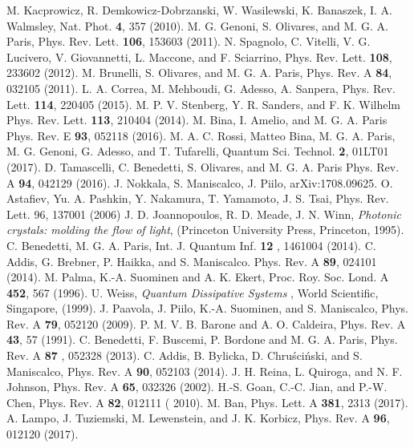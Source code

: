 \documentclass[ pra,a4paper,aps,twocolumn,superscriptaddress]{revtex4-1}
\begin{document}
\begin{thebibliography}{99}
 M. Kacprowicz, R. Demkowicz-Dobrzanski, W. Wasilewski, K. Banaszek, I. A. Walmsley, Nat. Phot. {\bf 4}, 357 (2010). 
 M. G. Genoni, S. Olivares, and M. G. A. Paris, Phys. Rev. Lett. {\bf 106}, 153603 (2011).
 N. Spagnolo, C. Vitelli, V. G. Lucivero, V. Giovannetti, L. Maccone, and F. Sciarrino,  Phys. Rev. Lett. {\bf 108}, 233602 (2012).
 M. Brunelli, S. Olivares, and M. G. A. Paris, Phys. Rev.  A {\bf 84}, 032105 (2011).
 L. A. Correa, M. Mehboudi, G. Adesso, A. Sanpera, 	Phys. Rev. Lett. {\bf 114}, 220405 (2015).
 M. P. V.  Stenberg, Y. R. Sanders, and F. K. Wilhelm
Phys. Rev. Lett. {\bf 113}, 210404 (2014).
 M. Bina, I. Amelio, and M. G. A. Paris
Phys. Rev. E {\bf 93}, 052118 (2016).
 M. A. C. Rossi, Matteo Bina, M. G. A. Paris, M. G. Genoni, G. Adesso, and
T. Tufarelli, Quantum Sci. Technol. {\bf 2}, 01LT01 (2017).
 D. Tamascelli, C. Benedetti, S. Olivares, and M. G. A. Paris
Phys. Rev. A {\bf 94}, 042129 (2016).
 J. Nokkala, S. Maniscalco, J. Piilo, 	arXiv:1708.09625.
 O. Astafiev, Yu. A. Pashkin, Y. Nakamura, T. Yamamoto, 
J. S. Tsai, Phys. Rev. Lett. 96, 137001 (2006)
 J. D. Joannopoulos, R. D. Meade, J. N. Winn, {\it 
Photonic crystals: molding the flow of light},  
(Princeton University Press, Princeton, 1995).
 C. Benedetti, M. G. A. Paris, Int. J. Quantum Inf. {\bf 12 }, 1461004 (2014).
 C. Addis, G. Brebner, P. Haikka, and S. Maniscalco. Phys. Rev. A {\bf 89}, 024101 (2014).
  M. Palma, K.-A. Suominen and A. K. Ekert, Proc. Roy. Soc. Lond.  A {\bf 452},  567 (1996).
  U. Weiss,{ \it{Quantum Dissipative Systems} }, World Scientific, Singapore, (1999).
  J. Paavola, J. Piilo, K.-A. Suominen, and S. Maniscalco, Phys. Rev. A {\bf 79}, 052120 (2009).
  P. M. V. B. Barone and A. O. Caldeira, Phys. Rev. A {\bf 43}, 57 (1991).
  C. Benedetti, F. Buscemi, P. Bordone and M. G. A. Paris, Phys. Rev. A {\bf 87 }, 052328 (2013).
 C. Addis, B. Bylicka, D. Chru\'sci\'nski, and S. Maniscalco, Phys. Rev. A {\bf 90}, 052103 (2014).  
 J. H. Reina, L. Quiroga, and N. F. Johnson, Phys. Rev. A {\bf 65}, 032326 (2002). 
 H.-S. Goan, C.-C. Jian, and P.-W. Chen, Phys. Rev. A {\bf 82}, 012111 ( 2010).
 M. Ban, Phys. Lett. A {\bf 381}, 2313 (2017). 
 A. Lampo, J. Tuziemski, M. Lewenstein, and J. K. Korbicz, Phys. Rev. A {\bf 96}, 012120 (2017).














\end{thebibliography}
\end{document}
